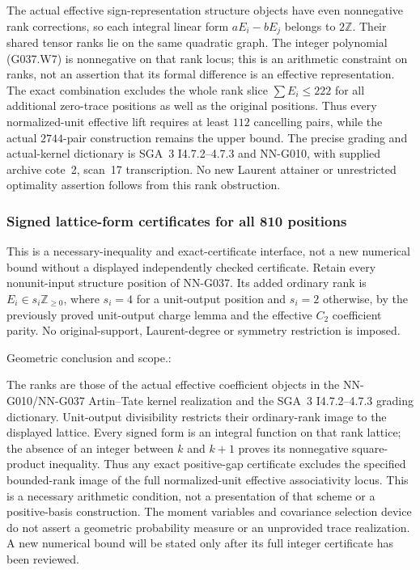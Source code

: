 \begin{geometricstatement}[NN-G037]
The actual effective sign-representation structure objects have
even nonnegative rank corrections, so each integral linear form
$aE_i-bE_j$ belongs to $2\mathbb Z$.  Their shared tensor ranks
lie on the same quadratic graph.  The integer polynomial
(G037.W7) is nonnegative on that rank locus; this is an arithmetic
constraint on ranks, not an assertion that its formal difference
is an effective representation.  The exact combination excludes
the whole rank slice $\sum E_i\le222$ for all additional
zero-trace positions as well as the original positions.  Thus
every normalized-unit effective lift requires at least $112$
cancelling pairs, while the actual $2744$-pair construction remains
the upper bound.  The precise grading and actual-kernel dictionary
is SGA~3 I4.7.2--4.7.3 and NN-G010, with supplied archive cote~2,
scan~17 transcription.  No new Laurent attainer or unrestricted
optimality assertion follows from this rank obstruction.

\subsubsection*{Signed lattice-form certificates for all 810 positions}

This is a necessary-inequality and exact-certificate interface, not a
new numerical bound without a displayed independently checked certificate.
Retain every nonunit-input structure position of NN-G037.  Its added
ordinary rank is $E_i\in s_i\mathbb Z_{\ge0}$, where $s_i=4$ for a
unit-output position and $s_i=2$ otherwise, by the previously proved
unit-output charge lemma and the effective $C_2$ coefficient parity.
No original-support, Laurent-degree or symmetry restriction is imposed.


Geometric conclusion and scope.:

The ranks are those of the actual effective coefficient objects
in the NN-G010/NN-G037 Artin--Tate kernel realization and the
SGA~3 I4.7.2--4.7.3 grading dictionary.  Unit-output divisibility
restricts their ordinary-rank image to the displayed lattice.
Every signed form is an integral function on that rank lattice;
the absence of an integer between $k$ and $k+1$ proves its
nonnegative square-product inequality.  Thus any exact positive-gap
certificate excludes the specified bounded-rank image of the full
normalized-unit effective associativity locus.  This is a necessary
arithmetic condition, not a presentation of that scheme or a
positive-basis construction.  The moment variables and covariance
selection device do not assert a geometric probability measure or
an unprovided trace realization.  A new numerical bound will be
stated only after its full integer certificate has been reviewed.


\end{geometricstatement}
